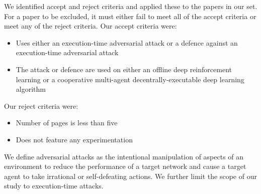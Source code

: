 \documentclass[conference,compsoc]{IEEEtran}
\begin{document}

We identified accept and reject criteria and applied these to the papers in our set. 
For a paper to be excluded, it must either fail to meet all of the accept criteria or meet any of the reject criteria. Our accept criteria were:

\begin{itemize}
    \item Uses either an execution-time adversarial attack or a defence against an execution-time adversarial attack
    \item The attack or defence are used on either an offline deep reinforcement learning or a cooperative multi-agent decentrally-executable deep learning algorithm
\end{itemize}

Our reject criteria were:
\begin{itemize}
    \item Number of pages is less than five
    \item Does not feature any experimentation
\end{itemize}

We define adversarial attacks as the intentional manipulation of aspects of an environment to reduce the performance of a target network and cause a target agent to take irrational or self-defeating actions. We further limit the scope of our study to execution-time attacks.
\end{document}
